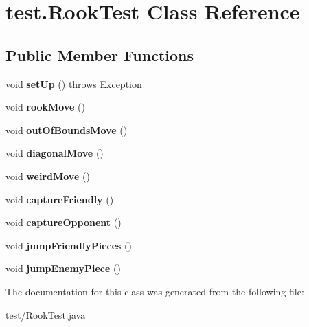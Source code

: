\hypertarget{classtest_1_1RookTest}{\section{test.\-Rook\-Test Class Reference}
\label{classtest_1_1RookTest}
}
\subsection*{Public Member Functions}
\begin{DoxyCompactItemize}
\item 
\hypertarget{classtest_1_1RookTest_add7be25aaf699f5602967c05afd1c440}{void {\bfseries set\-Up} ()  throws Exception }\label{classtest_1_1RookTest_add7be25aaf699f5602967c05afd1c440}

\item 
\hypertarget{classtest_1_1RookTest_a00f59be72d5e77c1031869173b367501}{void {\bfseries rook\-Move} ()}\label{classtest_1_1RookTest_a00f59be72d5e77c1031869173b367501}

\item 
\hypertarget{classtest_1_1RookTest_a51b0a931ae05c14967e0f12651f22108}{void {\bfseries out\-Of\-Bounds\-Move} ()}\label{classtest_1_1RookTest_a51b0a931ae05c14967e0f12651f22108}

\item 
\hypertarget{classtest_1_1RookTest_ad28cda0fc3b7ee0b496d6f83ed4b4378}{void {\bfseries diagonal\-Move} ()}\label{classtest_1_1RookTest_ad28cda0fc3b7ee0b496d6f83ed4b4378}

\item 
\hypertarget{classtest_1_1RookTest_a4df3d93b31c6f0774d51e6b1d37e70d4}{void {\bfseries weird\-Move} ()}\label{classtest_1_1RookTest_a4df3d93b31c6f0774d51e6b1d37e70d4}

\item 
\hypertarget{classtest_1_1RookTest_a350c9419e97f25750cb46c0300db7bed}{void {\bfseries capture\-Friendly} ()}\label{classtest_1_1RookTest_a350c9419e97f25750cb46c0300db7bed}

\item 
\hypertarget{classtest_1_1RookTest_a2ff3d4caae74d28c3011abf63d3ce4b5}{void {\bfseries capture\-Opponent} ()}\label{classtest_1_1RookTest_a2ff3d4caae74d28c3011abf63d3ce4b5}

\item 
\hypertarget{classtest_1_1RookTest_adb47a16b06bc068c3b7188565bba960b}{void {\bfseries jump\-Friendly\-Pieces} ()}\label{classtest_1_1RookTest_adb47a16b06bc068c3b7188565bba960b}

\item 
\hypertarget{classtest_1_1RookTest_a71ecc84ed26f7ef40f5d3bbcd87a42a9}{void {\bfseries jump\-Enemy\-Piece} ()}\label{classtest_1_1RookTest_a71ecc84ed26f7ef40f5d3bbcd87a42a9}

\end{DoxyCompactItemize}


The documentation for this class was generated from the following file\-:\begin{DoxyCompactItemize}
\item 
test/Rook\-Test.\-java\end{DoxyCompactItemize}
